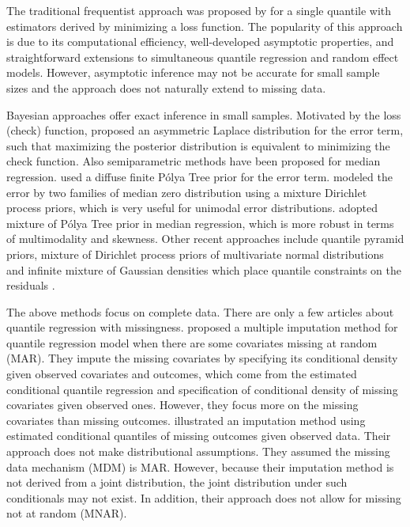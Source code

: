 \documentclass[useAMS,usenatbib,referee]{biom}
\newcommand{\polya}{P\'{o}lya} \newcommand{\yobs}{\bmath y_{\itl{obs}}}
\begin{document}
The traditional frequentist approach was proposed by
\citet{koenker1978} for a single quantile with estimators derived by
minimizing a loss function. The popularity of this approach is due to
its computational efficiency, well-developed asymptotic properties,
and straightforward extensions to simultaneous quantile regression and
random effect models. However, asymptotic inference may not be
accurate for small sample sizes and the approach does not naturally
extend to missing data.

Bayesian approaches offer exact inference in small samples. Motivated
by the loss (check) function, \citet{yu2001} proposed an asymmetric
Laplace distribution for the error term, such that maximizing the
posterior distribution is equivalent to minimizing the check function.
Also semiparametric methods have been proposed for median
regression. \citet{walker1999} used a diffuse finite \polya{} Tree
prior for the error term. \citet{kottas2001} modeled the error by two
families of median zero distribution using a mixture Dirichlet process
priors, which is very useful for unimodal error
distributions. \citet{hanson2002} adopted mixture of \polya{} Tree
prior in median regression, which is more robust in terms of
multimodality and skewness. Other recent approaches include quantile
pyramid priors, mixture of Dirichlet process priors of multivariate
normal distributions and infinite mixture of Gaussian densities which
place quantile constraints on the residuals \citep{hjort2007,
  hjort2009, kottas2009,reich2010}.

The above methods focus on complete data.  There are only a few
articles about quantile regression with missingness.  \citet{wei2012}
proposed a multiple imputation method for quantile regression model
when there are some covariates missing at random (MAR). They impute
the missing covariates by specifying its conditional density given
observed covariates and outcomes, which come from the estimated
conditional quantile regression and specification of conditional
density of missing covariates given observed ones.
However, they focus more on the missing covariates than missing outcomes.
\citet{bottai2013} illustrated an imputation method using estimated
conditional quantiles of missing outcomes given observed data. Their
approach does not make distributional assumptions.  They assumed the
missing data mechanism (MDM) is MAR. However, because their
imputation method is not derived from a joint distribution, the joint
distribution under such conditionals may not exist.  In addition, their
approach does not allow for missing not at random (MNAR).
\end{document}
